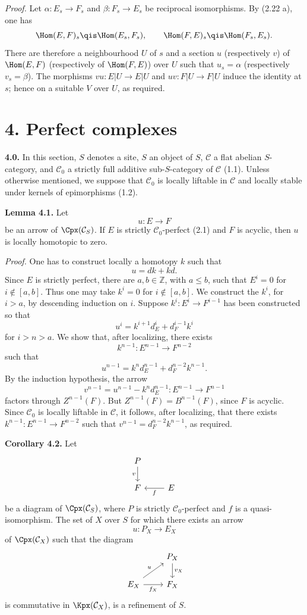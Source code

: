 \emph{Proof.} Let \(\alpha:E_s\to F_s\) and \(\beta:F_s\to E_s\) be reciprocal isomorphisms. By (2.22 a), one has
\[
  \Hom(E,F)_s\qis\Hom(E_s,F_s),
  \qquad
  \Hom(F,E)_s\qis\Hom(F_s,E_s).
\]
There are therefore a neighbourhood \(U\) of \(s\) and a section \(u\) (respectively \(v\)) of \(\Hom(E,F)\) (respectively of \(\Hom(F,E)\)) over \(U\) such that \(u_s=\alpha\) (respectively \(v_s=\beta\)). The morphisms \(vu:E|U\to E|U\) and \(uv:F|U\to F|U\) induce the identity at \(s\); hence on a suitable \(V\) over \(U\), as required.

\section*{4. Perfect complexes}

\textbf{4.0.} In this section, \(S\) denotes a site, \(S\) an object of \(S\), \(\mathcal C\) a flat abelian \(S\)-category, and \(\mathcal C_0\) a strictly full additive sub-\(S\)-category of \(\mathcal C\) (1.1). Unless otherwise mentioned, we suppose that \(\mathcal C_0\) is locally liftable in \(\mathcal C\) and locally stable under kernels of epimorphisms (1.2).

\textbf{Lemma 4.1.} Let
\[
  u:E\longrightarrow F
\]
be an arrow of \(\Cpx(\mathcal C_S)\). If \(E\) is strictly \(\mathcal C_0\)-perfect (2.1) and \(F\) is acyclic, then \(u\) is locally homotopic to zero.

\emph{Proof.} One has to construct locally a homotopy \(k\) such that
\[
  u=dk+kd.
\]
Since \(E\) is strictly perfect, there are \(a,b\in\mathbb Z\), with \(a\leq b\), such that \(E^i=0\) for \(i\notin[a,b]\). Thus one may take \(k^i=0\) for \(i\notin[a,b]\). We construct the \(k^i\), for \(i>a\), by descending induction on \(i\). Suppose \(k^i:E^i\to F^{i-1}\) has been constructed so that
\[
  u^i=k^{i+1}d_E^i+d_F^{i-1}k^i
\]
for \(i>n>a\). We show that, after localizing, there exists
\[
  k^{n-1}:E^{n-1}\longrightarrow F^{n-2}
\]
such that
\[
  u^{n-1}=k^n d_E^{n-1}+d_F^{n-2}k^{n-1}.
\]
By the induction hypothesis, the arrow
\[
  v^{n-1}=u^{n-1}-k^n d_E^{n-1}:E^{n-1}\longrightarrow F^{n-1}
\]
factors through \(Z^{n-1}(F)\). But \(Z^{n-1}(F)=B^{n-1}(F)\), since \(F\) is acyclic. Since \(\mathcal C_0\) is locally liftable in \(\mathcal C\), it follows, after localizing, that there exists \(k^{n-1}:E^{n-1}\to F^{n-2}\) such that \(v^{n-1}=d_F^{n-2}k^{n-1}\), as required.

\textbf{Corollary 4.2.} Let
\[
\begin{tikzcd}
P \arrow[d,"v"'] \\
F & E \arrow[l,"f"]
\end{tikzcd}
\]
be a diagram of \(\Cpx(\mathcal C_S)\), where \(P\) is strictly \(\mathcal C_0\)-perfect and \(f\) is a quasi-isomorphism. The set of \(X\) over \(S\) for which there exists an arrow
\[
  u:P_X\longrightarrow E_X
\]
of \(\Cpx(\mathcal C_X)\) such that the diagram
\[
\begin{tikzcd}
& P_X \arrow[d,"v_X"]\\
E_X \arrow[r,"f_X"'] \arrow[ur,"u"] & F_X
\end{tikzcd}
\]
is commutative in \(\Kpx(\mathcal C_X)\), is a refinement of \(S\).


